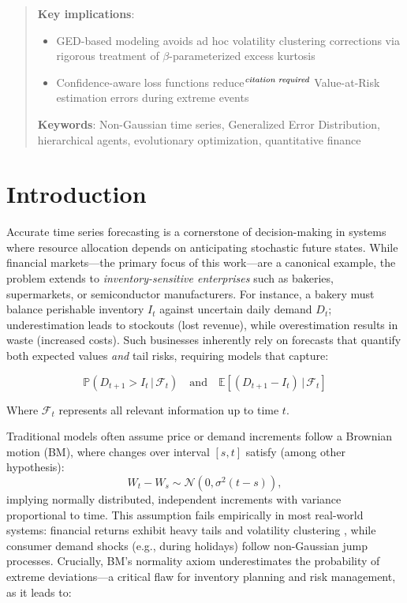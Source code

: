 \documentclass[12pt]{article}
\begin{document}
\begin{abstract}
\textbf{Key implications}:
\begin{itemize}
    \item GED-based modeling avoids ad hoc volatility clustering corrections via rigorous treatment of $\beta$-parameterized excess kurtosis
    \item Confidence-aware loss functions reduce$^\emph{citation required}$ Value-at-Risk estimation errors during extreme events
\end{itemize}

\textbf{Keywords}: Non-Gaussian time series, Generalized Error Distribution, hierarchical agents, evolutionary optimization, quantitative finance
\end{abstract}
\section{Introduction}
\label{sec:introduction}

Accurate time series forecasting is a cornerstone of decision-making in systems where resource allocation depends on anticipating stochastic future states. While financial markets---the primary focus of this work---are a canonical example, the problem extends to \emph{inventory-sensitive enterprises} such as bakeries, supermarkets, or semiconductor manufacturers. For instance, a bakery must balance perishable inventory $I_t$ against uncertain daily demand $D_t$; underestimation leads to stockouts (lost revenue), while overestimation results in waste (increased costs). Such businesses inherently rely on forecasts that quantify both expected values \emph{and} tail risks, requiring models that capture:

\begin{equation}
    \mathbb{P}(D_{t+1} > I_t \,|\, \mathscr{F}_t) \quad \text{and} \quad \mathbb{E}[(D_{t+1} - I_t) \,|\, \mathscr{F}_t]
\end{equation}

Where $\mathscr{F}_t$ represents all relevant information up to time $t$.

Traditional models often assume price or demand increments follow a Brownian motion (BM)\cite{bachelier1900, wiener1923}, where changes over interval $[s, t]$ satisfy (among other hypothesis):
\begin{equation}
    W_t - W_s \sim \mathcal{N}(0, \sigma^2(t-s)), 
\end{equation}
implying normally distributed, independent increments with variance proportional to time. This assumption fails empirically in most real-world systems: financial returns exhibit heavy tails and volatility clustering \cite{cont2001}, while consumer demand shocks (e.g., during holidays) follow non-Gaussian jump processes. Crucially, BM's normality axiom underestimates the probability of extreme deviations---a critical flaw for inventory planning and risk management, as it leads to:
\end{document}

